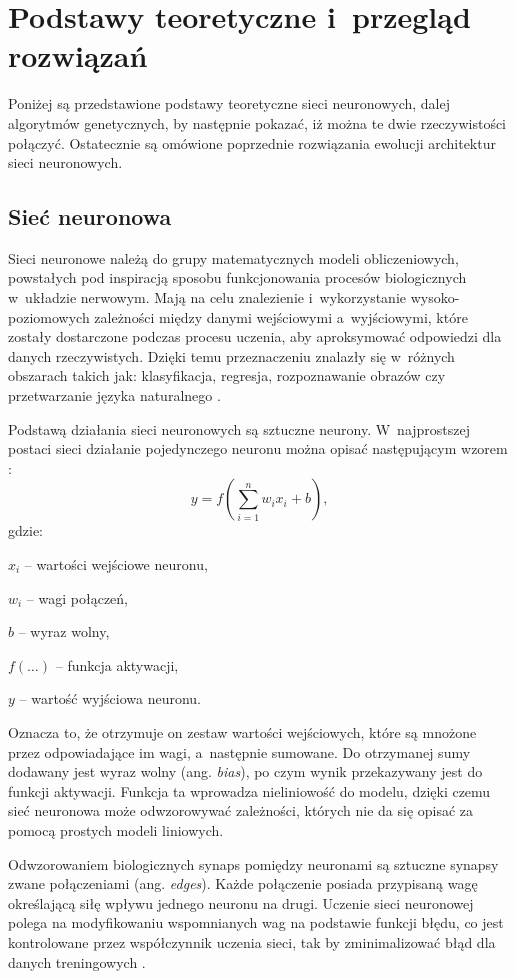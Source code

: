 \chapter{Podstawy teoretyczne i~przegląd rozwiązań}
\label{chap:theory}
Poniżej są przedstawione
podstawy teoretyczne sieci neuronowych,
dalej algorytmów genetycznych,
by następnie pokazać,
iż można te dwie
rzeczywistości połączyć.
Ostatecznie są omówione
poprzednie rozwiązania ewolucji
architektur sieci neuronowych.

\section{Sieć neuronowa}
Sieci neuronowe należą do grupy
matematycznych modeli obliczeniowych,
powstałych pod inspiracją sposobu funkcjonowania
procesów biologicznych w~układzie nerwowym.
Mają na celu znalezienie i~wykorzystanie
wysoko-poziomowych zależności
między danymi wejściowymi a~wyjściowymi,
które zostały dostarczone podczas procesu uczenia,
aby aproksymować odpowiedzi dla danych rzeczywistych.
Dzięki temu przeznaczeniu znalazły się
w~różnych obszarach takich jak:
klasyfikacja,
regresja, rozpoznawanie obrazów czy
przetwarzanie języka naturalnego%
.

Podstawą działania sieci neuronowych
są sztuczne neurony.
W~najprostszej postaci sieci działanie
pojedynczego neuronu można
opisać następującym wzorem%
:
$$
  y=f\left(
    \sum_{i=1}^{n}{w_i x_i}
    +b
  \right),
$$
gdzie:
\begin{nospitemize}
  \item $x_i$ -- wartości wejściowe neuronu,
  \item $w_i$ -- wagi połączeń,
  \item $b$ -- wyraz wolny,
  \item $f\left(\dots\right)$ -- funkcja aktywacji,
  \item $y$ -- wartość wyjściowa neuronu.
\end{nospitemize}
Oznacza to, że otrzymuje on zestaw wartości wejściowych,
które są mnożone przez odpowiadające im wagi,
a~następnie sumowane.
Do otrzymanej sumy dodawany
jest wyraz wolny (ang. \textit{bias}),
po czym wynik przekazywany jest
do funkcji aktywacji.
Funkcja ta wprowadza nieliniowość do modelu,
dzięki czemu sieć neuronowa
może odwzorowywać zależności,
których nie da się opisać
za pomocą prostych modeli liniowych.

Odwzorowaniem biologicznych synaps pomiędzy
neuronami są sztuczne synapsy
zwane połączeniami (ang. \textit{edges}).
Każde połączenie posiada przypisaną wagę
określającą siłę wpływu jednego neuronu na drugi.
Uczenie sieci neuronowej polega
na modyfikowaniu wspomnianych wag
na podstawie funkcji błędu,
co jest kontrolowane przez
współczynnik uczenia sieci,
tak by zminimalizować błąd
dla danych treningowych%
.


